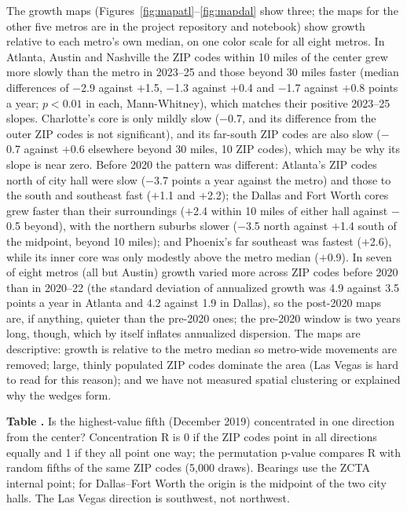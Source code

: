 \documentclass[11pt]{article}
\newcounter{tabnum}
\newcommand{\tab}[3]{%
  \begin{table}[!tbp]\centering
  \refstepcounter{tabnum}\label{#2}%
  {\small\raggedright\textbf{Table \thetabnum.} #3\par}\vspace{3pt}
  
  \end{table}}
\begin{document}
The growth maps (Figures~\ref{fig:mapatl}--\ref{fig:mapdal} show three; the maps for the other five metros are in the project
repository and notebook) show growth relative to each metro's own median, on one color scale for all eight metros. In Atlanta,
Austin and Nashville the ZIP codes within 10 miles of the center grew more slowly than the metro in 2023--25 and those beyond 30
miles faster (median differences of $-$2.9 against $+$1.5, $-$1.3 against $+$0.4 and $-$1.7 against $+$0.8 points a year; $p<0.01$
in each, Mann-Whitney), which matches their positive 2023--25 slopes. Charlotte's core is only mildly slow ($-$0.7, and its
difference from the outer ZIP codes is not significant), and its far-south ZIP codes are also slow ($-$0.7 against $+$0.6
elsewhere beyond 30 miles, 10 ZIP codes), which may be why its slope is near zero. Before 2020 the pattern was different:
Atlanta's ZIP codes north of city hall were slow ($-$3.7 points a year against the metro) and those to the south and southeast
fast ($+$1.1 and $+$2.2); the Dallas and Fort Worth cores grew faster than their surroundings ($+$2.4 within 10 miles of either
hall against $-$0.5 beyond), with the northern suburbs slower ($-$3.5 north against $+$1.4 south of the midpoint, beyond 10
miles); and Phoenix's far southeast was fastest ($+$2.6), while its inner core was only modestly above the metro median
($+$0.9). In seven of eight metros (all but Austin) growth varied more across ZIP codes before 2020 than in 2020--22 (the standard
deviation of annualized growth was 4.9 against 3.5 points a year in Atlanta and 4.2 against 1.9 in Dallas), so the post-2020 maps
are, if anything, quieter than the pre-2020 ones; the pre-2020 window is two years long, though, which by itself inflates
annualized dispersion. The maps are descriptive: growth is relative to the metro median so metro-wide movements are removed;
large, thinly populated ZIP codes dominate the area (Las Vegas is hard to read for this reason); and we have not measured spatial
clustering or explained why the wedges form.

\tab{t_wedge.tex}{tab:wedge}{Is the highest-value fifth (December 2019) concentrated in one direction from the center? Concentration R is 0 if
the ZIP codes point in all directions equally and 1 if they all point one way; the permutation p-value compares R with random
fifths of the same ZIP codes (5,000 draws). Bearings use the ZCTA internal point; for Dallas--Fort Worth the origin is the
midpoint of the two city halls. The Las Vegas direction is southwest, not northwest.}
\end{document}
